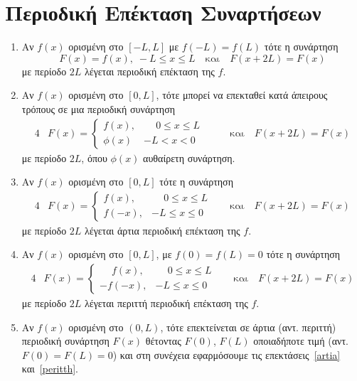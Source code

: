 \section{Περιοδική Επέκταση Συναρτήσεων}


\begin{enumerate}

  \item Αν $ f(x) $ ορισμένη στο $ [-L,L] $ με $ f(-L)=f(L) $ τότε η συνάρτηση
    \[
      F(x) = f(x), \; -L \leq x \leq L \quad \text{και} \quad F(x+2L)=F(x)
    \]
    με περίοδο $ 2L $ λέγεται \textcolor{Col1}{περιοδική επέκταση} της $f$. 

  \item Αν $ f(x) $ ορισμένη στο $ [0,L] $, τότε μπορεί να επεκταθεί 
    κατά άπειρους τρόπους σε μια περιοδική συνάρτηση 
    \begin{alignat*}{4}
            &F(x) = 
            \begin{cases}  
              f(x), & \phantom{-} 0 \leq x \leq L \\
              \phi(x) & -L < x < 0
            \end{cases}  & \quad & \text{και} \quad F(x+2L)=F(x)
    \end{alignat*}
    με περίοδο $ 2L $, όπου $ \phi(x) $ αυθαίρετη συνάρτηση. 

  \item\label{artia} Αν $ f(x) $ ορισμένη στο $ [0,L] $ τότε η συνάρτηση 
    \begin{alignat*}{4}
            & F(x) = 
            \begin{cases}  
              f(x), & \phantom{-} 0 \leq x \leq L \\
              f(-x), & -L \leq x \leq 0
            \end{cases}  & \quad \text{και} \quad F(x+2L)=F(x)
    \end{alignat*}
    με περίοδο $ 2L $ λέγεται \textcolor{Col1}{άρτια περιοδική επέκταση} της $f$.

  \item\label{peritth} Αν $ f(x) $ ορισμένη στο $ [0,L] $, με $ f(0)=f(L)=0 $ 
    τότε η συνάρτηση
    \begin{alignat*}{4}
            &F(x) = 
            \begin{cases}  
              \phantom{-} f(x), & \phantom{-} 0 \leq x \leq L \\
              -f(-x), & -L \leq x \leq 0
            \end{cases}  & \quad \text{και} \quad F(x+2L)=F(x)
    \end{alignat*}
    με περίοδο $ 2L $ λέγεται \textcolor{Col1}{περιττή περιοδική επέκταση} της $f$.

  \item Αν $ f(x) $ ορισμένη στο $ (0,L) $, τότε επεκτείνεται σε 
    άρτια (αντ. περιττή) περιοδική συνάρτηση $ F(x) $ θέτοντας $ F(0) $, 
    $ F(L) $ οποιαδήποτε τιμή (αντ. $F(0)=F(L)=0$) και στη συνέχεια εφαρμόσουμε 
    τις επεκτάσεις~\ref{artia} και~\ref{peritth}.
\end{enumerate}



